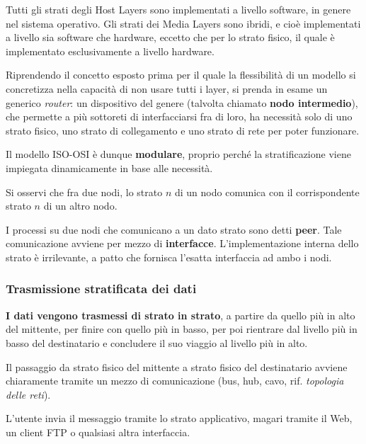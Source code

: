 \vspace{3mm}

Tutti gli strati degli Host Layers sono implementati a livello software, in genere nel sistema operativo. Gli strati dei Media Layers sono ibridi, e cioè implementati a livello sia software che hardware, eccetto che per lo strato fisico, il quale è implementato esclusivamente a livello hardware.

Riprendendo il concetto esposto prima per il quale la flessibilità di un modello si concretizza nella capacità di non usare tutti i layer, si prenda in esame un generico \textit{router}: un dispositivo del genere (talvolta chiamato \textbf{nodo intermedio}), che permette a più sottoreti di interfacciarsi fra di loro, ha necessità solo di uno strato fisico, uno strato di collegamento e uno strato di rete per poter funzionare.

Il modello ISO-OSI è dunque \textbf{modulare}, proprio perché la stratificazione viene impiegata dinamicamente in base alle necessità.

Si osservi che fra due nodi, lo strato \(n\) di un nodo comunica con il corrispondente strato \(n\) di un altro nodo. 

I processi su due nodi che comunicano a un dato strato sono detti \textbf{peer}. Tale comunicazione avviene per mezzo di \textbf{interfacce}. L'implementazione interna dello strato è irrilevante, a patto che fornisca l'esatta interfaccia ad ambo i nodi.

\subsubsection{Trasmissione stratificata dei dati}

\textbf{I dati vengono trasmessi di strato in strato}, a partire da quello più in alto del mittente, per finire con quello più in basso, per poi rientrare dal livello più in basso del destinatario e concludere il suo viaggio al livello più in alto.

\vspace{3mm}

Il passaggio da strato fisico del mittente a strato fisico del destinatario avviene chiaramente tramite un mezzo di comunicazione (bus, hub, cavo, rif. \textit{topologia delle reti}).

\vspace{3mm}

L'utente invia il messaggio tramite lo strato applicativo, magari tramite il Web, un client FTP o qualsiasi altra interfaccia.

